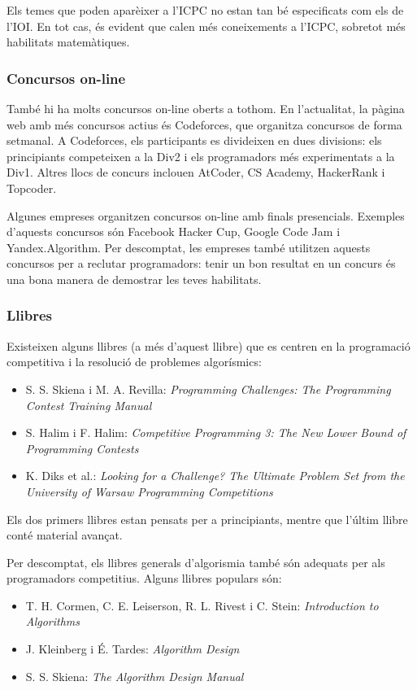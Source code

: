 Els temes que poden aparèixer a l'ICPC no estan tan bé
especificats com els de l'IOI.
En tot cas, és evident que calen més coneixements
a l'ICPC, sobretot més habilitats matemàtiques.

\subsubsection{Concursos on-line}

També hi ha molts concursos on-line oberts a tothom.
En l'actualitat, la p\`agina web amb més concursos actius és Codeforces,
que organitza concursos de forma setmanal.
A Codeforces, els participants es divideixen en dues divisions:
els principiants competeixen a la Div2 i els programadors més experimentats a
la Div1.
Altres llocs de concurs inclouen AtCoder, CS Academy, HackerRank i Topcoder.

Algunes empreses organitzen concursos on-line amb finals presencials.
Exemples d'aquests concursos són Facebook Hacker Cup,
Google Code Jam i Yandex.Algorithm.
Per descomptat, les empreses també utilitzen aquests concursos per a reclutar
programadors:
tenir un bon resultat en un concurs és una bona manera de demostrar les teves habilitats.

\subsubsection{Llibres}

Existeixen alguns llibres (a més d'aquest llibre) que
es centren en la programació competitiva i la resolució de problemes
algorísmics:

\begin{itemize}
\item S. S. Skiena i M. A. Revilla:
\emph{Programming Challenges: The Programming Contest Training Manual} \cite{ski03}
\item S. Halim i F. Halim:
\emph{Competitive Programming 3: The New Lower Bound of Programming Contests} \cite{hal13}
\item K. Diks et al.: \emph{Looking for a Challenge? The Ultimate Problem Set from
the University of Warsaw Programming Competitions} \cite{dik12}
\end{itemize}

Els dos primers llibres estan pensats per a principiants,
mentre que l'últim llibre conté material avançat.

Per descomptat, els llibres generals d'algorismia també són adequats
per als programadors competitius.
Alguns llibres populars són:

\begin{itemize}
\item T. H. Cormen, C. E. Leiserson, R. L. Rivest i C. Stein:
\emph{Introduction to Algorithms} \cite{cor09}
\item J. Kleinberg i É. Tardes:
\emph{Algorithm Design} \cite{kle05}
\item S. S. Skiena:
\emph{The Algorithm Design Manual} \cite{ski08}
\end{itemize}
